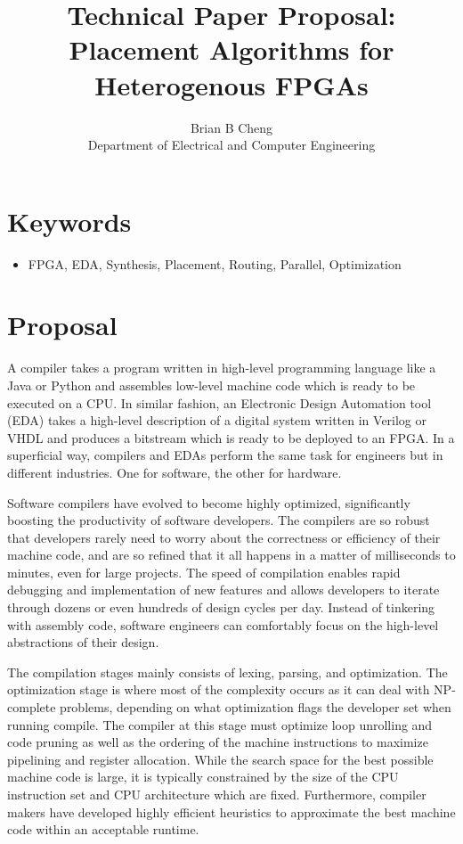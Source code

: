 \documentclass{article}
\begin{document}
\title{Technical Paper Proposal: \\ Placement Algorithms for Heterogenous FPGAs}
\author{Brian B Cheng \\ Department of Electrical and Computer Engineering}


\date{}
\maketitle

\section{Keywords}
\begin{itemize}
    \item FPGA, EDA, Synthesis, Placement, Routing, Parallel, Optimization
\end{itemize}


\section{Proposal}
    A compiler takes a program written in high-level programming language like a Java or Python and assembles low-level machine code which is ready to be executed on a CPU.
    In similar fashion, an Electronic Design Automation tool (EDA) takes a high-level description of a digital system written in Verilog or VHDL and produces a bitstream which is ready to be deployed to an FPGA.
    In a superficial way, compilers and EDAs perform the same task for engineers but in different industries. 
    One for software, the other for hardware.

    Software compilers have evolved to become highly optimized, significantly boosting the productivity of software developers. 
    The compilers are so robust that developers rarely need to worry about the correctness or efficiency of their machine code, and are so refined that it all happens in a matter of milliseconds to minutes, even for large projects. %
    The speed of compilation enables rapid debugging and implementation of new features and allows developers to iterate through dozens or even hundreds of design cycles per day.
    Instead of tinkering with assembly code, software engineers can comfortably focus on the high-level abstractions of their design. 

    The compilation stages mainly consists of lexing, parsing, and optimization.
    The optimization stage is where most of the complexity occurs as it can deal with NP-complete problems, depending on what optimization flags the developer set when running compile.
    The compiler at this stage must optimize loop unrolling and code pruning as well as the ordering of the machine instructions to maximize pipelining and register allocation.
    While the search space for the best possible machine code is large, it is typically constrained by the size of the CPU instruction set and CPU architecture which are fixed.
    Furthermore, compiler makers have developed highly efficient heuristics to approximate the best machine code within an acceptable runtime.
\end{document}
